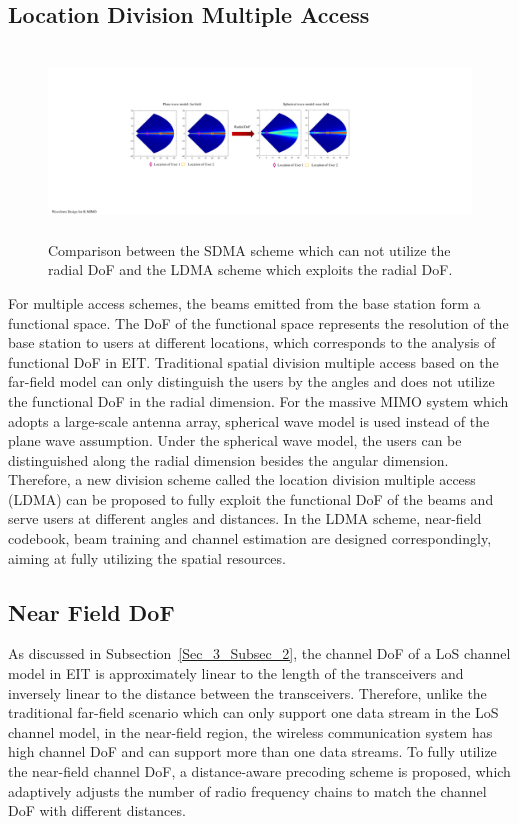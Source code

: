 \documentclass[journal,twocolumn]{IEEEtran}
\begin{document}
\subsection{Location Division Multiple Access}
\begin{figure}
	\centering 
	\includegraphics[height=5cm, width=15cm]{figures/LDMA.pdf} 
	\caption{Comparison between the SDMA scheme which can not utilize the radial DoF and the LDMA scheme which exploits the radial DoF. \cite{zhangzijian} }
	\label{fig:LDMA}
\end{figure}
For multiple access schemes, the beams emitted from the base station form a functional space. The DoF of the functional space represents the resolution of the base station to users at different locations, which corresponds to the analysis of functional DoF in EIT. Traditional spatial division multiple access based on the far-field model can only distinguish the users by the angles and does not utilize the functional DoF in the radial dimension. For the massive MIMO system which adopts a large-scale antenna array, spherical wave model is used instead of the plane wave assumption. Under the spherical wave model, the users can be distinguished along the radial dimension besides the angular dimension. Therefore, a new division scheme called the location division multiple access (LDMA) can be proposed to fully exploit the functional DoF of the beams and serve users at different angles and distances. In the LDMA scheme, near-field codebook, beam training and channel estimation are designed correspondingly, aiming at fully utilizing the spatial resources. 

\subsection{Near Field DoF}
As discussed in Subsection~\ref{Sec_3_Subsec_2}, the channel DoF of a LoS channel model in EIT is approximately linear to the length of the transceivers and inversely linear to the distance between the transceivers. Therefore, unlike the traditional far-field scenario which can only support one data stream in the LoS channel model, in the near-field region, the wireless communication system has high channel DoF and can support more than one data streams. To fully utilize the near-field channel DoF, a distance-aware precoding scheme is proposed, which adaptively adjusts the number of radio frequency chains to match the channel DoF with different distances.   
\end{document}
